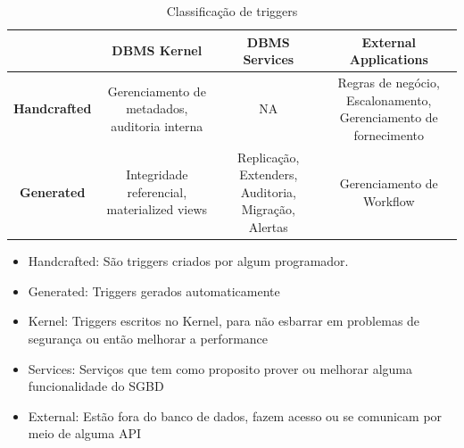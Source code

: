 \documentclass[conference]{IEEEtran}
\begin{document}
 \begin{table}[!t]
    \renewcommand{\arraystretch}{1}
    \caption{Classificação de triggers}
    \label{table_example}
    \centering
    \begin{tabular}{ c  c  c  c  }
      \hline 
	 & \bfseries DBMS Kernel & \bfseries DBMS Services & \bfseries External Applications \\
        \hline
            \bfseries Handcrafted &
            Gerenciamento de metadados, auditoria interna &
            NA &
            Regras de negócio, Escalonamento, Gerenciamento de fornecimento\\
	\hline
            \bfseries Generated &
            Integridade referencial, materialized views &
            Replicação, Extenders, Auditoria, Migração, Alertas &
            Gerenciamento de Workflow \\
	\hline
        \end{tabular}
    \end{table}

    \begin{itemize}
        \item{Handcrafted}: São triggers criados por algum programador.
        \item{Generated}: Triggers gerados automaticamente
        \item{Kernel}: Triggers escritos no Kernel, para não esbarrar em problemas de segurança ou então melhorar a performance
        \item{Services}: Serviços que tem como proposito prover ou melhorar alguma funcionalidade do SGBD
        \item{External}: Estão fora do banco de dados, fazem acesso ou se comunicam por meio de alguma API
    \end{itemize}
\end{document}
